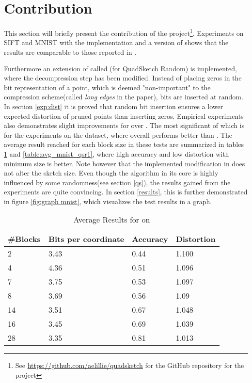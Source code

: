 \section{Contribution}
\label{contribution}
This section will briefly present the contribution of the project\footnote{See \url{https://github.com/aelillie/quadsketch} for the GitHub repository for the project}. Experiments on SIFT and MNIST with the \qs{} implementation and a version of \gr{} shows that the results are comparable to those reported in \cite{wagner17}. 

Furthermore an extension of \qs{} called \qsr{} (for QuadSketch Random) is implemented, where the decompression step has been modified. Instead of placing zeros in the bit representation of a point, which is deemed "non-important" to the compression scheme(called \textit{long edges} in the paper), bits are inserted at random. In section \ref{exp:dist} it is proved that random bit insertion ensures a lower expected distortion of pruned points than inserting zeros. Empirical experiments also demonstrates slight improvements for \qsr{} over \qs{}. The most significant of which is for the experiments on the \mnist{} dataset, where \qsr{} overall performs better than \qs{}. The average result reached for each block size in these tests are summarized in tables \ref{table:avg_mnist_qs1} and \ref{table:avg_mnist_qsr1}, where high accuracy and low distortion with minimum size is better. Note however that the implemented modification in \qsr{} does not alter the sketch size. Even though the algorithm in its core is highly influenced by some randomness(see section \ref{qs}), the results gained from the experiments are quite convincing. In section \ref{results}, this is further demonstrated in figure \ref{fig:graph mnist}, which visualizes the test results in a graph. 

\clearpage

\begin{table}[h]
	\centering
	\caption{Average Results for \qs{} on \mnist{}}
	\label{table:avg_mnist_qs1}
	\begin{tabular}{l l l l}
		\hline
		\#Blocks & Bits per coordinate & Accuracy  & Distortion \\ \hline
		2 & 3.43 & 0.44 & 1.100  \\
		4 & 4.36 & 0.51 & 1.096  \\
		7 & 3.75 & 0.53 & 1.097 \\
		8 & 3.69 & 0.56 & 1.09 \\
		14 & 3.51 & 0.67 & 1.048 \\
		16 & 3.45 & 0.69 & 1.039 \\
		28 & 3.35 & 0.81 & 1.013 \\
		\hline
	\end{tabular}
\end{table}

